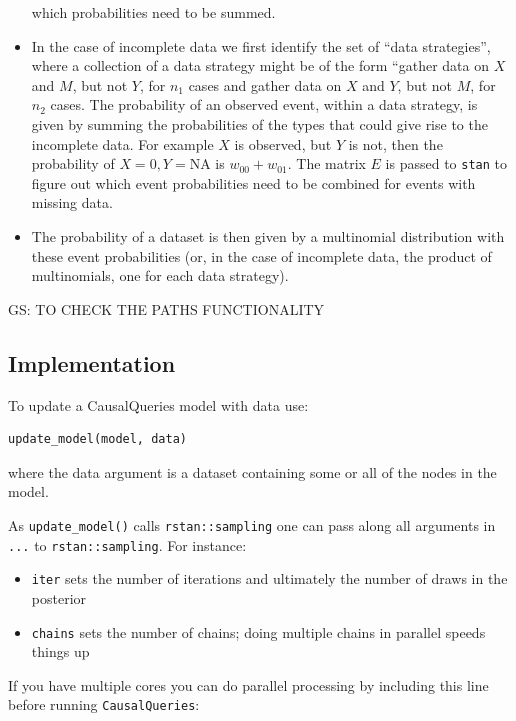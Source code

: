 \documentclass[
  article]{jss}
\providecommand{\tightlist}{%
  \setlength{\itemsep}{0pt}\setlength{\parskip}{0pt}}\usepackage{longtable,booktabs,array}
\begin{document}
\begin{itemize}
  which probabilities need to be summed.
\item
  In the case of incomplete data we first identify the set of ``data
  strategies'', where a collection of a data strategy might be of the
  form ``gather data on \(X\) and \(M\), but not \(Y\), for \(n_1\)
  cases and gather data on \(X\) and \(Y\), but not \(M\), for \(n_2\)
  cases. The probability of an observed event, within a data strategy,
  is given by summing the probabilities of the types that could give
  rise to the incomplete data. For example \(X\) is observed, but \(Y\)
  is not, then the probability of \(X=0, Y = \text{NA}\) is
  \(w_{00} +w_{01}\). The matrix \(E\) is passed to \texttt{stan} to
  figure out which event probabilities need to be combined for events
  with missing data.
\item
  The probability of a dataset is then given by a multinomial
  distribution with these event probabilities (or, in the case of
  incomplete data, the product of multinomials, one for each data
  strategy).
\end{itemize}

GS: TO CHECK THE PATHS FUNCTIONALITY

\hypertarget{implementation}{%
\subsection{Implementation}\label{implementation}}

To update a CausalQueries model with data use:

\begin{verbatim}
update_model(model, data)
\end{verbatim}

where the data argument is a dataset containing some or all of the nodes
in the model.

As \texttt{update\_model()} calls \texttt{rstan::sampling} one can pass
along all arguments in \texttt{...} to \texttt{rstan::sampling}. For
instance:

\begin{itemize}
\tightlist
\item
  \texttt{iter} sets the number of iterations and ultimately the number
  of draws in the posterior
\item
  \texttt{chains} sets the number of chains; doing multiple chains in
  parallel speeds things up
\end{itemize}

If you have multiple cores you can do parallel processing by including
this line before running \texttt{CausalQueries}:
\end{document}
